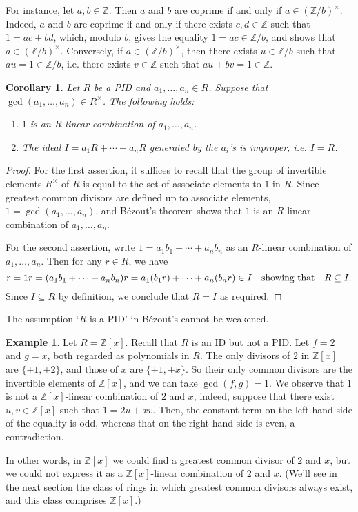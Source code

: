 \documentclass[12pt]{article}
\newcommand{\qbox}[1]{\quad\hbox{#1}\quad}
\newtheorem{cor}[thm]{Corollary}
\theoremstyle{definition}
\newtheorem{example}[thm]{Example}
\newcounter{ex}\renewcommand\theex{\arabic{ex}}
\newcommand{\Z}{\ensuremath{\mathbb{Z}}}
\begin{document}
For instance, let $a,b\in\Z$. Then $a$ and $b$ are coprime if and only
if $a\in(\Z/b)^\times$. Indeed, $a$ and $b$ are coprime if and only if
there exists $c,d\in\Z$ such that $1=ac+bd$, which, modulo $b$, gives
the equality $1=ac\in\Z/b$, and shows that
$a\in(\Z/b)^\times$. Conversely, if $a\in(\Z/b)^\times$, then there exists
$u\in\Z/b$ such that $au=1\in\Z/b$, i.e. there exists $v\in\Z$ such
that $au+bv=1\in\Z$.

\begin{cor}\label{cor:bezout}
Let $R$ be a PID and $a_1,\dots,a_n\in R$. Suppose that 
$\gcd(a_1,\dots,a_n)\in R^\times$. The following holds:
\begin{enumerate}
\item $1$ is an $R$-linear combination of $a_1,\dots,a_n$.
\item The ideal $I=a_1R+\cdots+a_nR$ generated by the $a_i$'s is
improper, i.e. $I=R$.
\end{enumerate}
\end{cor}

\begin{proof}
For the first assertion, it suffices to recall that the group of
invertible elements $R^\times$ of $R$ is equal to the set of associate
elements to $1$ in $R$. Since greatest common divisors are defined up
to associate elements, $1=\gcd(a_1,\dots,a_n)$, and B\'ezout's theorem
shows that $1$ is an $R$-linear combination of $a_1,\dots,a_n$.

For the second assertion, write
$1=a_1b_1+\cdots+a_nb_n$ as an $R$-linear combination of
$a_1,\dots,a_n$. Then for any $r\in R$, we have
$$r=1r=(a_1b_1+\cdots+a_nb_n)r=a_1(b_1r)+\cdots+a_n(b_nr)\in I
\qbox{showing that}R\subseteq I.$$
Since $I\subseteq R$ by definition, we conclude that $R=I$ as required.
\end{proof}

The assumption `$R$ is a PID' in B\'ezout's cannot be weakened.

\begin{example}
Let $R=\Z[x]$. Recall that $R$ is an ID but not a PID. Let $f=2$ and
$g=x$, both regarded as polynomials in $R$. The only divisors of $2$
in $\Z[x]$ are $\{\pm1,\pm2\}$, and those of $x$ are
$\{\pm1,\pm x\}$. So their only common divisors are the invertible
elements of $\Z[x]$, and we can take $\gcd(f,g)=1$.
We observe that $1$ is not a $\Z[x]$-linear combination of $2$ and $x$,
indeed, suppose that there exist $u,v\in\Z[x]$ such that
$1=2u+xv$. Then, the constant term on the left hand side of the
equality is odd, whereas that on the right hand side is even, a
contradiction.

In other words, in $\Z[x]$ we could find a greatest common divisor of
$2$ and $x$, but we could not express it as a $\Z[x]$-linear
combination of $2$ and $x$. (We'll see in the next section the class
of rings in which greatest common divisors always exist, and this
class comprises $\Z[x]$.)

\end{example}
\end{document}
